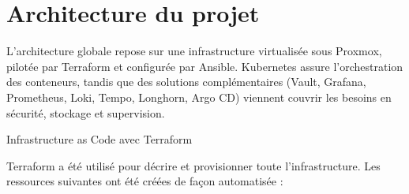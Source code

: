 



\section{Architecture du projet}

L'architecture globale repose sur une infrastructure virtualisée sous Proxmox, pilotée par Terraform et configurée par Ansible. Kubernetes assure l'orchestration des conteneurs, tandis que des solutions complémentaires (Vault, Grafana, Prometheus, Loki, Tempo, Longhorn, Argo CD) viennent couvrir les besoins en sécurité, stockage et supervision.


	{Infrastructure as Code avec Terraform}

Terraform a été utilisé pour décrire et provisionner toute l'infrastructure. Les ressources suivantes ont été créées de façon automatisée :


